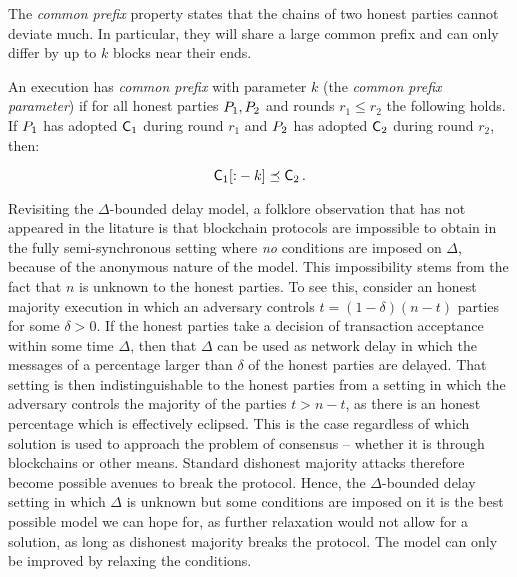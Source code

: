 The \emph{common prefix} property states that the chains of two honest parties
cannot deviate much. In particular, they will share a large common prefix and
can only differ by up to $k$ blocks near their ends.

\begin{definition}
  An execution has \emph{common prefix} with parameter $k$ (the \emph{common
  prefix parameter}) if for all honest parties $P_1, P_2$ and rounds
  $r_1 \leq r_2$ the following holds. If $P_1$ has adopted $\mathsf{C}_1$
  during round $r_1$ and $P_2$ has adopted $\mathsf{C}_2$ during round $r_2$,
  then:

  \[
  \mathsf{C}_1[{:}-k] \preceq \mathsf{C}_2
  \,.
  \]
\end{definition}

\begin{remark}
Revisiting the $\Delta$-bounded delay model, a folklore observation that has not appeared in
the litature is that blockchain protocols are impossible to obtain in the fully
semi-synchronous setting where \emph{no} conditions are imposed on $\Delta$,
because of the anonymous nature of the model. This impossibility stems from the
fact that $n$ is unknown to the honest parties. To see this, consider an
honest majority execution in which an adversary controls $t = (1 - \delta)(n -
t)$ parties for some $\delta > 0$. If the honest parties take a decision of
transaction acceptance within some time $\Delta$, then that $\Delta$ can be used
as network delay in which the messages of a percentage larger than $\delta$ of
the honest parties are delayed. That setting is then indistinguishable to the
honest parties from a setting in which the adversary controls the majority of
the parties $t > n - t$, as there is an honest percentage which is effectively
eclipsed. This is the case regardless of which solution is used to approach the
problem of consensus -- whether it is through blockchains or other means.
Standard dishonest majority attacks therefore become possible avenues to break
the protocol. Hence, the $\Delta$-bounded delay setting in which $\Delta$ is
unknown but some conditions are imposed on it is the best possible model we can
hope for, as further relaxation would not allow for a solution, as long as
dishonest majority breaks the protocol. The model can only be improved by
relaxing the conditions.
\end{remark}


